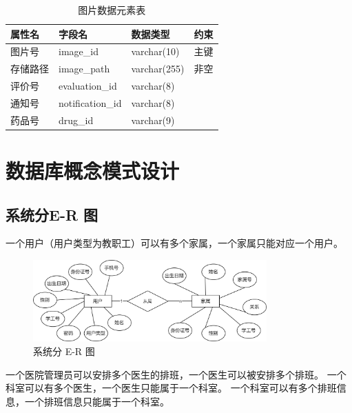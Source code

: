 \documentclass{article}
\begin{document}
\begin{table}[H]
    \centering
    \begin{tabularx}{\textwidth}{|>{\raggedright\arraybackslash}X|>{\raggedright\arraybackslash}X|>{\raggedright\arraybackslash}X|>{\raggedright\arraybackslash}X|}
    \toprule
    \textbf{属性名} & \textbf{字段名} & \textbf{数据类型} & \textbf{约束} \\ \midrule
    图片号 & image\_id & varchar(10) & 主键 \\ \midrule
    存储路径 & image\_path & varchar(255) & 非空 \\ \midrule
    评价号 & evaluation\_id & varchar(8) &  \\ \midrule
    通知号 & notification\_id & varchar(8) &  \\ \midrule
    药品号 & drug\_id & varchar(9) &  \\ \bottomrule
    \end{tabularx}
    \caption{图片数据元素表}
    \label{tab:image_elements}
\end{table}

\section{数据库概念模式设计}

\subsection{系统分E-R 图}

一个用户（用户类型为教职工）可以有多个家属，一个家属只能对应一个用户。

\begin{figure}[H]
    \centering
    \includegraphics[width=0.8\textwidth]{images/dividedER1.png}
    \caption{系统分 E-R 图}
\end{figure}

一个医院管理员可以安排多个医生的排班，一个医生可以被安排多个排班。
一个科室可以有多个医生，一个医生只能属于一个科室。
一个科室可以有多个排班信息，一个排班信息只能属于一个科室。
\end{document}
